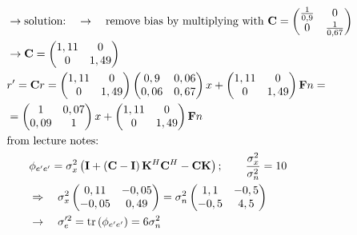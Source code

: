 \begin{align*}
	& \rightarrow\text{solution:}\quad\rightarrow\quad\text{remove bias by multiplying with }\mathbf{C}=
	\begin{pmatrix}
	\frac{1}{0,9} & 0 \\
	0 & \frac{1}{0,67}
	\end{pmatrix} \\
	& \rightarrow\mathbf{C}=
	\begin{pmatrix}
	1,11 & 0 \\
	0 & 1,49
	\end{pmatrix} \\
	& r'=\mathbf{C}r=
	\begin{pmatrix}
	1,11 & 0 \\
	0 & 1,49
	\end{pmatrix}
	\begin{pmatrix}
	0,9 & 0,06 \\
	0,06 & 0,67
	\end{pmatrix}x+
	\begin{pmatrix}
	1,11 & 0 \\
	0 & 1,49
	\end{pmatrix}\mathbf{F}n=\\
	& =
	\begin{pmatrix}
	1 & 0,07 \\
	0,09 & 1
	\end{pmatrix}x+
	\begin{pmatrix}
	1,11 & 0 \\
	0 & 1,49
	\end{pmatrix}\mathbf{F}n \\
	& \text{from lecture notes:} \\
	& \qquad\phi_{e'e'}=\sigma_x^2\left(\mathbf{I}+\left(\mathbf{C-I}\right)\mathbf{K}^H\mathbf{C}^H-\mathbf{CK}\right);\qquad\frac{\sigma_x^2}{\sigma_n^2}=10 \\
	& \qquad\Rightarrow\quad\sigma_x^2
	\begin{pmatrix}
	0,11 & -0,05 \\
	-0,05 & 0,49
	\end{pmatrix}=\sigma_n^2
	\begin{pmatrix}
	1,1 & -0,5 \\
	-0,5 & 4,5
	\end{pmatrix} \\
	& \qquad\rightarrow\quad\sigma_e'^2=\operatorname{tr}\left(\phi_{e'e'}\right)=6\sigma_n^2
\end{align*}
